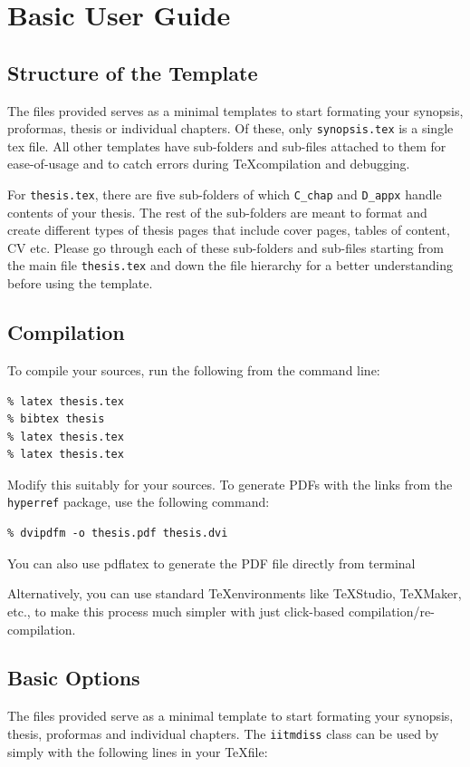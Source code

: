 \section{Basic User Guide}

\subsection{Structure of the Template}
The files provided serves as a minimal templates to start formating your synopsis, proformas, thesis or individual chapters. Of these, only \verb+synopsis.tex+ is a single tex file. All other templates have sub-folders and sub-files attached to them for ease-of-usage and to catch errors during \TeX compilation and debugging.

For \verb+thesis.tex+, there are five sub-folders of which \verb+C_chap+ and \verb+D_appx+ handle contents of your thesis. The rest of the sub-folders are meant to format and create different types of thesis pages that include cover pages, tables of content, CV etc. Please go through each of these sub-folders and sub-files starting from the main file \verb+thesis.tex+ and down the file hierarchy for a better understanding before using the template.

\subsection{Compilation}
To compile your sources, run the following from the command line:
\begin{verbatim}
% latex thesis.tex
% bibtex thesis
% latex thesis.tex
% latex thesis.tex
\end{verbatim}

Modify this suitably for your sources. To generate PDFs with the links from the \verb+hyperref+ package, use the following command:
\begin{verbatim}
% dvipdfm -o thesis.pdf thesis.dvi
\end{verbatim}
You can also use pdflatex to generate the PDF file directly from terminal

Alternatively, you can use standard \TeX environments like \TeX Studio, \TeX Maker, etc., to make this process much simpler with just click-based compilation/re-compilation.

\subsection{Basic Options}
The files provided serve as a minimal template to start formating your synopsis, thesis, proformas and individual chapters. The \verb+iitmdiss+ class can be used by simply with the following lines in your \TeX file:

